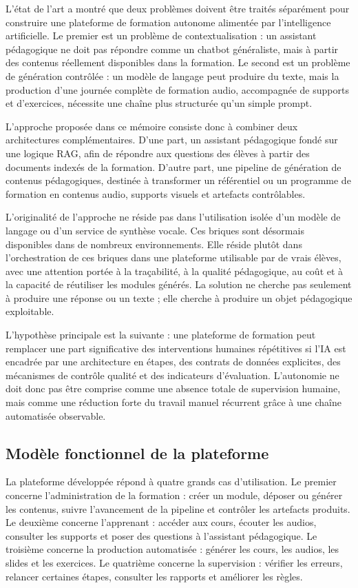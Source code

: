 \documentclass[12pt,a4paper]{article}
\begin{document}
L'état de l'art a montré que deux problèmes doivent être traités séparément pour
construire une plateforme de formation autonome alimentée par l'intelligence
artificielle. Le premier est un problème de contextualisation : un assistant pédagogique
ne doit pas répondre comme un chatbot généraliste, mais à partir des contenus réellement
disponibles dans la formation. Le second est un problème de génération contrôlée : un
modèle de langage peut produire du texte, mais la production d'une journée complète de
formation audio, accompagnée de supports et d'exercices, nécessite une chaîne plus
structurée qu'un simple prompt.

L'approche proposée dans ce mémoire consiste donc à combiner deux architectures
complémentaires. D'une part, un assistant pédagogique fondé sur une logique RAG, afin
de répondre aux questions des élèves à partir des documents indexés de la formation.
D'autre part, une pipeline de génération de contenus pédagogiques, destinée à transformer
un référentiel ou un programme de formation en contenus audio, supports visuels et
artefacts contrôlables.

L'originalité de l'approche ne réside pas dans l'utilisation isolée d'un modèle de langage
ou d'un service de synthèse vocale. Ces briques sont désormais disponibles dans de
nombreux environnements. Elle réside plutôt dans l'orchestration de ces briques dans une
plateforme utilisable par de vrais élèves, avec une attention portée à la traçabilité, à la
qualité pédagogique, au coût et à la capacité de réutiliser les modules générés. La solution
ne cherche pas seulement à produire une réponse ou un texte ; elle cherche à produire un
objet pédagogique exploitable.

L'hypothèse principale est la suivante : une plateforme de formation peut remplacer une
part significative des interventions humaines répétitives si l'IA est encadrée par une
architecture en étapes, des contrats de données explicites, des mécanismes de contrôle
qualité et des indicateurs d'évaluation. L'autonomie ne doit donc pas être comprise comme
une absence totale de supervision humaine, mais comme une réduction forte du travail
manuel récurrent grâce à une chaîne automatisée observable.

\subsection{Modèle fonctionnel de la plateforme}

La plateforme développée répond à quatre grands cas d'utilisation. Le premier concerne
l'administration de la formation : créer un module, déposer ou générer les contenus,
suivre l'avancement de la pipeline et contrôler les artefacts produits. Le deuxième
concerne l'apprenant : accéder aux cours, écouter les audios, consulter les supports et
poser des questions à l'assistant pédagogique. Le troisième concerne la production
automatisée : générer les cours, les audios, les slides et les exercices. Le quatrième
concerne la supervision : vérifier les erreurs, relancer certaines étapes, consulter les
rapports et améliorer les règles.
\end{document}
